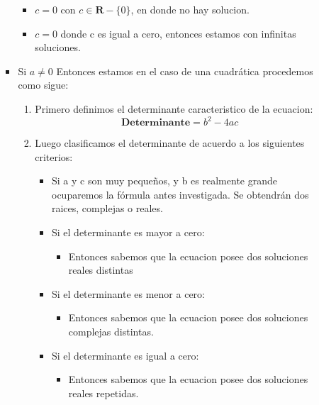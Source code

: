 \documentclass[spanish, fleqn]{article}
\begin{document}
\begin{enumerate}
\begin{enumerate}
\begin{itemize}
\begin{itemize}
                \item $c = 0$ con $c \in \mathbf{R} - \{ 0 \} $, en donde no hay solucion.
                \item $ c = 0$ donde c es igual a cero, entonces estamos con infinitas soluciones.
                \end{itemize}
            	\item Si $a \neq 0$ Entonces estamos en el caso de una cuadrática procedemos como sigue:
                \begin{enumerate}
                \item  Primero definimos el determinante caracteristico de la ecuacion:
                	\begin{equation*}
                		\textbf{Determinante} = b^{2} - 4 a c
                	\end{equation*}
                \item Luego clasificamos el determinante de acuerdo a los siguientes criterios:
                	\begin{itemize}
                    \item Si a y c son muy pequeños, y b es realmente grande ocuparemos la f\'ormula antes investigada. Se obtendr\'an dos raices, complejas o reales.
                	\item Si el determinante es mayor a cero:
                    	\begin{itemize}
                    	\item Entonces sabemos que la ecuacion posee dos soluciones reales distintas
                    	\end{itemize}
                    \item Si el determinante es menor a cero:
                    	\begin{itemize}
                    	\item Entonces sabemos que la ecuacion posee dos soluciones complejas distintas.
                    	\end{itemize}
                    \item Si el determinante es igual a cero:
                        \begin{itemize}
                        \item Entonces sabemos que la ecuacion posee dos soluciones reales repetidas.
                        \end{itemize}
                    \end{itemize}
                \end{enumerate}
            	\end{itemize} 
            \end{enumerate}
            

\end{enumerate}
\end{document}
